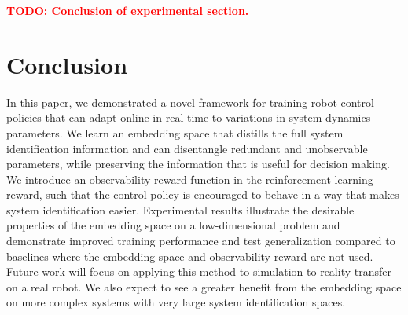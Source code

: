 \documentclass{article}
\newcommand{\TODO}[1]{\textcolor{red}{\textbf{TODO: #1}}}
\newcommand{\latset}{\mathcal{E}}
\begin{document}
\TODO{Conclusion of experimental section.}

\section{Conclusion}
In this paper, we demonstrated a novel framework for training robot control policies
that can adapt online in real time to variations in system dynamics parameters.
We learn an embedding space that distills the full system identification information
and can disentangle redundant and unobservable parameters, while preserving the information that is useful for decision making.
We introduce an observability reward function in the reinforcement learning reward,
such that the control policy is encouraged to behave in a way that makes system identification easier.
Experimental results illustrate the desirable properties of the embedding space on a low-dimensional problem
and demonstrate improved training performance and test generalization compared to baselines
where the embedding space and observability reward are not used.
Future work will focus on applying this method to simulation-to-reality transfer on a real robot.
We also expect to see a greater benefit from the embedding space on more complex systems with very large system identification spaces.

\clearpage
{}
\end{document}
